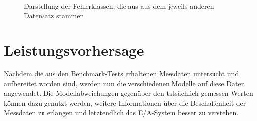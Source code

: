 \documentclass[
	twoside,
	12pt,
	a4paper,
	BCOR10mm,
	DIV14,
	listof=totoc,
	bibliography=totoc,
	headsepline
]{scrreprt}
\begin{document}
\begin{figure}
	\centering
	\hfill
	\\
	\hfill
	\caption{Darstellung der Fehlerklassen, die aus aus dem jeweils anderen Datensatz stammen}
	\label{fig:error_classes_switched}
\end{figure} 
\clearpage

\section{Leistungsvorhersage}
\label{eval:leistungsvorhersage}
Nachdem die aus den Benchmark-Tests erhaltenen Messdaten untersucht und aufbereitet worden sind, werden nun die verschiedenen Modelle auf diese Daten angewendet.
Die Modellabweichungen gegenüber den tatsächlich gemessen Werten können dazu genutzt werden, weitere Informationen über die Beschaffenheit der Messdaten zu erlangen und letztendlich das E/A-System besser zu verstehen.\medskip
\end{document}
